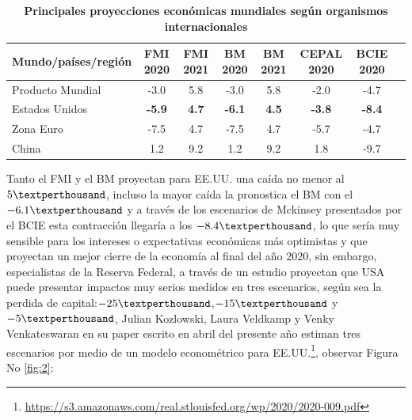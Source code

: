   \begin{table}[H]
	\centering
	\caption{\textbf{Principales proyecciones económicas mundiales según organismos internacionales}}
	\label{Tabla 2}
	\resizebox{16cm}{!} { 
		\begin{tabular}{lccccccc} \toprule			
		\textbf{	Mundo/países/región}	&	\textbf{FMI 2020}	&	\textbf{FMI 2021}	&	\textbf{BM 2020}	&	\textbf{BM 2021}	&	\textbf{CEPAL 2020}	&	\textbf{BCIE 2020}	\\  \midrule
			Producto Mundial	&	-3.0	&	5.8	&	-3.0	&	5.8	&	-2.0	&	-4.7	\\ 
			Estados Unidos	&	\textbf{-5.9}	&	\textbf{4.7}	&	\textbf{-6.1}	&	\textbf{4.5}	&	\textbf{-3.8}	&	\textbf{-8.4}	\\ 
			Zona Euro	&	-7.5	&	4.7	&	-7.5	&	4.7	&	-5.7	&	-4.7	\\ 
			China	&	1.2	&	9.2	&	1.2	&	9.2	&	1.8	&	-9.7	\\  \bottomrule
				
			
		\end{tabular} 
		
	}
	{\small {}}
	
\end{table}

Tanto el FMI y el BM proyectan para EE.UU. una caída no menor al $5 \textperthousand$, incluso la mayor caída la pronostica el BM con el $-6.1 \textperthousand$ y a través de los escenarios de Mckinsey presentados por el BCIE esta contracción llegaría a los $-8.4 \textperthousand$, lo que sería muy sensible para los intereses o expectativas económicas más optimistas y que proyectan un mejor cierre de la economía al final del año 2020, sin embargo, especialistas de la Reserva Federal, a través de un estudio proyectan que USA puede presentar impactos muy serios medidos en tres escenarios, según sea la perdida de capital:$-25 \textperthousand$,$-15 \textperthousand$ y $-5 \textperthousand$, \cite{kozlowski2020scarring} Julian Kozlowski, Laura Veldkamp y Venky Venkateswaran en su paper escrito en abril del presente año estiman tres escenarios por medio de un modelo econométrico para EE.UU.\footnote{\href{https://s3.amazonaws.com/real.stlouisfed.org/wp/2020/2020-009.pdf}{https://s3.amazonaws.com/real.stlouisfed.org/wp/2020/2020-009.pdf}}, observar Figura No \eqref{fig:2}:



